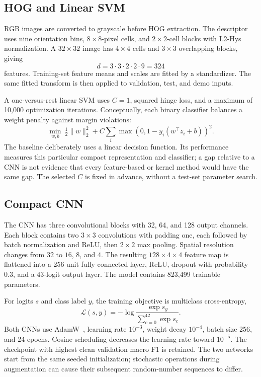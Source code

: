 \documentclass[conference]{IEEEtran}
\begin{document}
\subsection{HOG and Linear SVM}
RGB images are converted to grayscale before HOG extraction. The descriptor uses nine orientation bins, $8\times8$-pixel cells, and $2\times2$-cell blocks with L2-Hys normalization. A $32\times32$ image has $4\times4$ cells and $3\times3$ overlapping blocks, giving
\begin{equation}
d=3\cdot3\cdot2\cdot2\cdot9=324
\end{equation}
features. Training-set feature means and scales are fitted by a standardizer. The same fitted transform is then applied to validation, test, and demo inputs.

A one-versus-rest linear SVM uses $C=1$, squared hinge loss, and a maximum of 10,000 optimization iterations. Conceptually, each binary classifier balances a weight penalty against margin violations:
\begin{equation}
\min_{w,b}\ \tfrac12\lVert w\rVert_2^2+C\sum_i\max(0,1-y_i(w^\top z_i+b))^2.
\end{equation}
The baseline deliberately uses a linear decision function. Its performance measures this particular compact representation and classifier; a gap relative to a CNN is not evidence that every feature-based or kernel method would have the same gap. The selected $C$ is fixed in advance, without a test-set parameter search.

\subsection{Compact CNN}
The CNN has three convolutional blocks with 32, 64, and 128 output channels. Each block contains two $3\times3$ convolutions with padding one, each followed by batch normalization and ReLU, then $2\times2$ max pooling. Spatial resolution changes from $32$ to $16$, $8$, and $4$. The resulting $128\times4\times4$ feature map is flattened into a 256-unit fully connected layer, ReLU, dropout with probability 0.3, and a 43-logit output layer. The model contains 823,499 trainable parameters.

For logits $s$ and class label $y$, the training objective is multiclass cross-entropy,
\begin{equation}
\mathcal{L}(s,y)=-\log\frac{\exp s_y}{\sum_{c=0}^{42}\exp s_c}.
\end{equation}
Both CNNs use AdamW~\cite{adamw}, learning rate $10^{-3}$, weight decay $10^{-4}$, batch size 256, and 24 epochs. Cosine scheduling decreases the learning rate toward $10^{-5}$. The checkpoint with highest clean validation macro F1 is retained. The two networks start from the same seeded initialization; stochastic operations during augmentation can cause their subsequent random-number sequences to differ.
\end{document}
